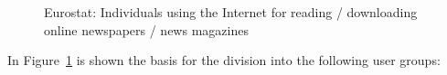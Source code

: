 \begin{figure}[h!tp]
{  %
} \qquad
{}
\caption{Eurostat: Individuals using the Internet for reading / downloading online newspapers / news magazines}
	\label{fig:charts-usergroups}
\end{figure}

In Figure~\ref{fig:charts-usergroups} is shown the basis for the division into the following user groups:

